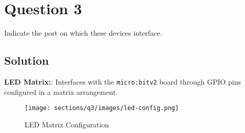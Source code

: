 \section*{Question 3}

Indicate the port on which these devices interface.

\subsection*{Solution}

\textbf{LED Matrix:}: Interfaces with the \texttt{micro:bit\;v2} board through GPIO pins configured in a matrix arrangement.

\begin{figure*}[htbp]
    \centering
    \texttt{[image: sections/q3/images/led-config.png]}
    \caption{
        LED Matrix Configuration
    }\label{fig:led-config}
\end{figure*}
